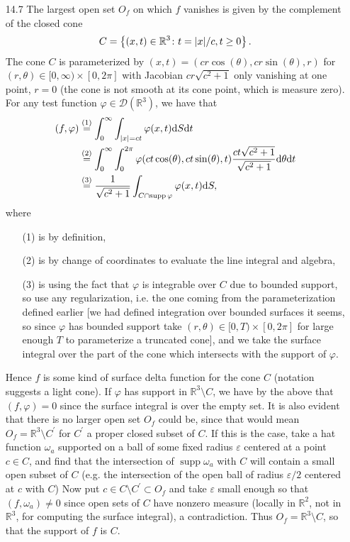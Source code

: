 \documentclass[11pt]{article}
\newcommand{\cbr}[1]{\left\{#1\right\}}
\newcommand{\eq}[1]{\overset{(#1)}{=}}
\DeclareMathOperator{\supp}{supp}
\begin{document}
\begin{enumerate}
    \hrulefill

    \item[14.7] The largest open set $O_f$ on which $f$ vanishes is given by the complement of the closed cone \[C = \cbr{(x,t)\in\mathbb{R}^3\colon t = \abs{x}/c, t\geq 0}.\] The cone $C$ is parameterized by $(x,t) = (cr\cos(\theta),cr\sin(\theta),r)$ for $(r,\theta)\in [0,\infty)\times[0,2\pi]$ with Jacobian $cr\sqrt{c^2+1}$ only vanishing at one point, $r = 0$ (the cone is not smooth at its cone point, which is measure zero). For any test function $\varphi\in \mathcal{D}(\mathbb{R}^3)$, we have that \begin{align*}
        (f,\varphi) &\eq{1} \int_0^\infty\int_{\abs{x} = ct}\varphi(x,t)\dd S \dd t \\
        &\eq{2} \int_0^\infty \int_0^{2\pi}\varphi(ct\cos(\theta), ct\sin(\theta), t) \frac{ct\sqrt{c^2+1}}{\sqrt{c^2+1}}\dd\theta\dd t \\
        &\eq{3} \frac{1}{\sqrt{c^2+1}}\int_{C\cap \supp\varphi}\varphi(x,t)\dd S,
    \end{align*} where \begin{enumerate}
        \item[(1)] is by definition,
        \item[(2)] is by change of coordinates to evaluate the line integral and algebra, 
        \item[(3)] is using the fact that $\varphi$ is integrable over $C$ due to bounded support, so use any regularization, i.e. the one coming from the parameterization defined earlier [we had defined integration over bounded surfaces it seems, so since $\varphi$ has bounded support take $(r,\theta)\in [0,T)\times[0,2\pi]$ for large enough $T$ to parameterize a truncated cone], and we take the surface integral over the part of the cone which intersects with the support of $\varphi$.
    \end{enumerate} Hence $f$ is some kind of surface delta function for the cone $C$ (notation suggests a light cone). If $\varphi$ has support in $\mathbb{R}^3\setminus C$, we have by the above that $(f,\varphi) = 0$ since the surface integral is over the empty set. It is also evident that there is no larger open set $O_f$ could be, since that would mean $O_f = \mathbb{R}^3\setminus C^\prime$ for $C^\prime$ a proper closed subset of $C$. If this is the case, take a hat function $\omega_a$ supported on a ball of some fixed radius $\varepsilon$ centered at a point $c\in C$, and find that the intersection of $\supp\omega_a$ with $C$ will contain a small open subset of $C$ (e.g. the intersection of the open ball of radius $\varepsilon/2$ centered at $c$ with $C$) Now put $c\in C\setminus C^\prime\subset O_f$ and take $\varepsilon$ small enough so that $(f,\omega_a)\neq 0$ since open sets of $C$ have nonzero measure (locally in $\mathbb{R}^2$, not in $\mathbb{R}^3$, for computing the surface integral), a contradiction. Thus $O_f = \mathbb{R}^3\setminus C$, so that the support of $f$ is $C$.


\end{enumerate}
\end{document}
